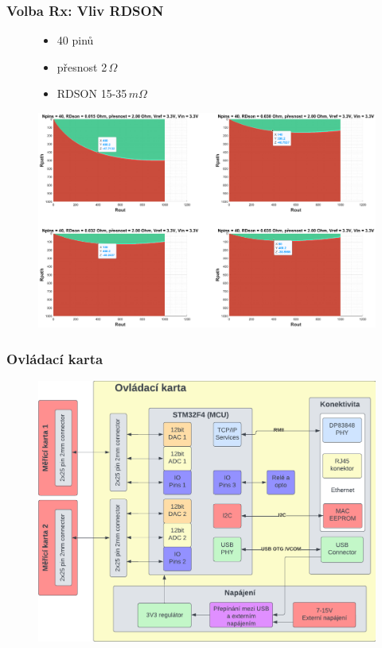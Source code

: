 \documentclass[%
  12pt,       				%
	t,                  %
	aspectratio=1610,   %
	unicode,						%
]{beamer}				    	%
\begin{document}
\begin{frame} 
	\frametitle{Volba Rx: Vliv RDSON}
	\begin{figure}[ht!]
		\centering
		\begin{minipage}{0.3\textwidth}
			\begin{itemize}
				\item 40 pinů
				\item přesnost 2\,$\Omega$
				\item RDSON 15-35\,$m\Omega$
			\end{itemize}
		\end{minipage}
		\begin{minipage}{0.65\textwidth}
		\includegraphics[width = 1.1\textwidth]{obrazky/vliv_RDSON.eps}
		\end{minipage}
	\end{figure}
\end{frame}


\begin{frame} 
	\frametitle{Ovládací karta}

	\begin{figure}[ht!]
		\centering
		\includegraphics[height = 0.8\textheight]{obrazky/ovladaci_karta_diag.png}
	\end{figure}
\end{frame}
\end{document}
